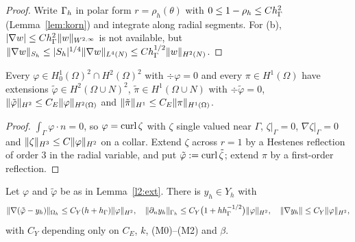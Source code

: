\begin{proof}
Write $\Gamma_h$ in polar form $r=\rho_h(\theta)$ with $0\le1-\rho_h\le Ch_\Gamma^2$ (Lemma~\ref{lem:korn}) and integrate along radial segments. For (b), $|\nabla w|\le Ch_\Gamma^2\lVert w\rVert_{W^{2,\infty}}$ is not available, but $\lVert \nabla w\rVert_{S_h}\le|S_h|^{1/4}\lVert \nabla w\rVert_{L^4(N)}\le Ch_\Gamma^{1/2}\lVert w\rVert_{H^2(N)}$.
\end{proof}

\begin{lemma}\label{l2:ext}
Every $\varphi\in H^1_0(\Omega)^2\cap H^2(\Omega)^2$ with $\div\varphi=0$ and every $\pi\in H^1(\Omega)$ have extensions $\tilde\varphi\in H^2(\Omega\cup N)^2$, $\tilde\pi\in H^1(\Omega\cup N)$ with $\div\tilde\varphi=0$, $\lVert \tilde\varphi\rVert_{H^2}\le C_E\lVert \varphi\rVert_{H^2(\Omega)}$ and $\lVert \tilde\pi\rVert_{H^1}\le C_E\lVert \pi\rVert_{H^1(\Omega)}$.
\end{lemma}

\begin{proof}
$\int_\Gamma\varphi\cdot n=0$, so $\varphi=\operatorname{curl}\zeta$ with $\zeta$ single valued near $\Gamma$, $\zeta|_\Gamma=0$, $\nabla\zeta|_\Gamma=0$ and $\lVert \zeta\rVert_{H^3}\le C\lVert \varphi\rVert_{H^2}$ on a collar. Extend $\zeta$ across $r=1$ by a Hestenes reflection of order $3$ in the radial variable, and put $\tilde\varphi:=\operatorname{curl}\tilde\zeta$; extend $\pi$ by a first-order reflection.
\end{proof}

\begin{lemma}[Approximation in $Y_h$]\label{l2:Y}
Let $\varphi$ and $\tilde\varphi$ be as in Lemma~\ref{l2:ext}. There is $y_h\in Y_h$ with
\[
\lVert \nabla(\tilde\varphi-y_h)\rVert_{\Omega_h}\le C_Y(h+h_\Gamma)\lVert \varphi\rVert_{H^2},\quad
\lVert \partial_n y_h\rVert_{\Gamma_h}\le C_Y\bigl(1+hh_\Gamma^{-1/2}\bigr)\lVert \varphi\rVert_{H^2},\quad
\lVert \nabla y_h\rVert\le C_Y\lVert \varphi\rVert_{H^2},
\]
with $C_Y$ depending only on $C_E$, $k$, (M0)--(M2) and $\beta$.
\end{lemma}

